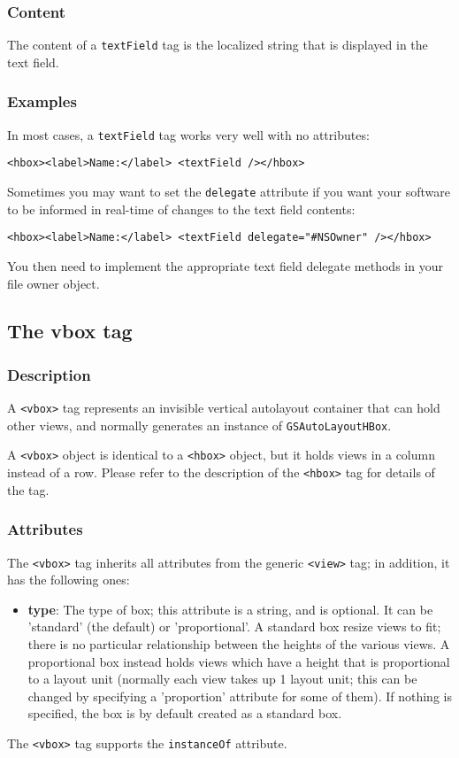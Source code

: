 \subsubsection{Content}
The content of a \texttt{textField} tag is the localized string that
is displayed in the text field.

\subsubsection{Examples}
In most cases, a \texttt{textField} tag works very well with no attributes:
\begin{verbatim}
<hbox><label>Name:</label> <textField /></hbox>
\end{verbatim}

Sometimes you may want to set the \texttt{delegate} attribute if you
want your software to be informed in real-time of changes to the text
field contents:
\begin{verbatim}
<hbox><label>Name:</label> <textField delegate="#NSOwner" /></hbox>
\end{verbatim}
You then need to implement the appropriate text field delegate methods
in your file owner object.

\subsection{The vbox tag}

\subsubsection{Description}
A \texttt{<vbox>} tag represents an invisible vertical autolayout
container that can hold other views, and normally generates an
instance of \texttt{GSAutoLayoutHBox}.

A \texttt{<vbox>} object is identical to a \texttt{<hbox>} object, but
it holds views in a column instead of a row.  Please refer to the
description of the \texttt{<hbox>} tag for details of the tag.

\subsubsection{Attributes}
The \texttt{<vbox>} tag inherits all attributes from the generic
\texttt{<view>} tag; in addition, it has the following ones:
\begin{itemize}
\item {\bf type}: The type of box; this attribute is a string, and is
  optional.  It can be 'standard' (the default) or 'proportional'.  A
  standard box resize views to fit; there is no particular
  relationship between the heights of the various views.  A
  proportional box instead holds views which have a height that is
  proportional to a layout unit (normally each view takes up 1 layout
  unit; this can be changed by specifying a 'proportion' attribute for
  some of them).  If nothing is specified, the box is by default
  created as a standard box.
\end{itemize}
The \texttt{<vbox>} tag supports the \texttt{instanceOf} attribute.

